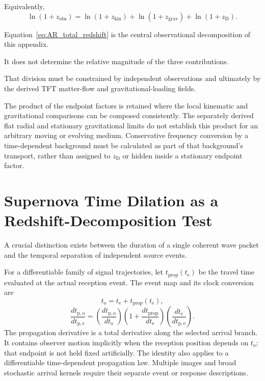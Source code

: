 Equivalently,
\begin{equation}
    \boxed{
    \ln(1+z_{\mathrm{obs}})
    =
    \ln(1+z_{\mathrm{kin}})
    +
    \ln(1+z_{\mathrm{grav}})
    +
    \ln(1+z_{\mathrm D}).
    }
    \label{eq:AR_total_log}
\end{equation}

Equation~\eqref{eq:AR_total_redshift} is the central observational
decomposition of this appendix.

It does not determine the relative magnitude of the three contributions.

That division must be constrained by independent observations and ultimately
by the derived TFT matter-flow and gravitational-loading fields.

The product of the endpoint factors is retained where the local kinematic
and gravitational comparisons can be composed consistently. The separately
derived flat radial and stationary gravitational limits do not establish
this product for an arbitrary moving or evolving medium. Conservative
frequency conversion by a time-dependent background must be calculated as
part of that background's transport, rather than assigned to
\(z_{\mathrm D}\) or hidden inside a stationary endpoint factor.


\section{Supernova Time Dilation as a Redshift-Decomposition Test}

A crucial distinction exists between the duration of a single coherent wave
packet and the temporal separation of independent source events.

For a differentiable family of signal trajectories, let
\(t_{\mathrm{prop}}(t_{\mathrm e})\) be the travel time evaluated at the actual
reception event. The event map and its clock conversion are
\[
    t_{\mathrm o}
    =t_{\mathrm e}+t_{\mathrm{prop}}(t_{\mathrm e}),
\]
\[
    \frac{dt_{\mathrm{p,o}}}{dt_{\mathrm{p,e}}}
    =\left(\frac{dt_{\mathrm{p,o}}}{dt_{\mathrm o}}\right)
     \left(1+\frac{dt_{\mathrm{prop}}}{dt_{\mathrm e}}\right)
     \left(\frac{dt_{\mathrm e}}{dt_{\mathrm{p,e}}}\right).
\]
The propagation derivative is a total derivative along the selected arrival
branch. It contains observer motion implicitly when the reception position
depends on \(t_{\mathrm o}\); that endpoint is not held fixed artificially.
The identity also applies to a differentiable time-dependent propagation
law. Multiple images and broad stochastic arrival kernels require their
separate event or response descriptions.

